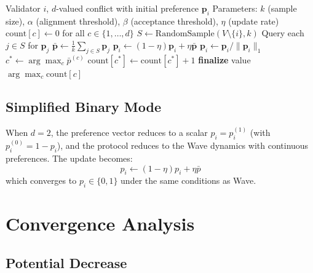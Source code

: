 \documentclass[11pt,a4paper]{article}
\begin{document}
\begin{algorithm}[H]
\caption{Field Protocol --- Multi-Valued Consensus}
\label{alg:field-core}
\begin{algorithmic}[1]
\Require Validator $i$, $d$-valued conflict with initial preference $\mathbf{p}_i$
\Require Parameters: $k$ (sample size), $\alpha$ (alignment threshold), $\beta$ (acceptance threshold), $\eta$ (update rate)
\State $\text{count}[c] \gets 0$ for all $c \in \{1, \ldots, d\}$
    \State $S \gets \text{RandomSample}(V \setminus \{i\}, k)$
    \State Query each $j \in S$ for $\mathbf{p}_j$
    \State $\bar{\mathbf{p}} \gets \frac{1}{k} \sum_{j \in S} \mathbf{p}_j$ 
    \State {}
    \State $\mathbf{p}_i \gets (1 - \eta) \mathbf{p}_i + \eta \bar{\mathbf{p}}$ 
    \State $\mathbf{p}_i \gets \mathbf{p}_i / \|\mathbf{p}_i\|_1$ 
    \State $c^* \gets \arg\max_c \bar{p}^{(c)}$ 
     
        \State $\text{count}[c^*] \gets \text{count}[c^*] + 1$
    \EndIf
        \State \textbf{finalize} value $\arg\max_c \text{count}[c]$
    \EndIf
\EndWhile
\end{algorithmic}
\end{algorithm}

\subsection{Simplified Binary Mode}

When $d = 2$, the preference vector reduces to a scalar $p_i = p_i^{(1)}$ (with
$p_i^{(0)} = 1 - p_i$), and the protocol reduces to the Wave dynamics with continuous
preferences. The update becomes:
\[
p_i \gets (1 - \eta) p_i + \eta \bar{p}
\]
which converges to $p_i \in \{0, 1\}$ under the same conditions as Wave.

\section{Convergence Analysis}
\label{sec:potential}

\subsection{Potential Decrease}
\end{document}
